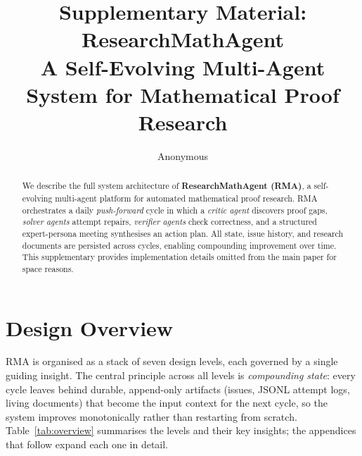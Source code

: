 \documentclass[11pt]{article}
\title{Supplementary Material: ResearchMathAgent\\
A Self-Evolving Multi-Agent System for Mathematical Proof Research}
\author{Anonymous}
\begin{document}
\maketitle

\begin{abstract}
We describe the full system architecture of \textbf{ResearchMathAgent (RMA)}, a
self-evolving multi-agent platform for automated mathematical proof research.
RMA orchestrates a daily \emph{push-forward} cycle in which a \emph{critic agent}
discovers proof gaps, \emph{solver agents} attempt repairs, \emph{verifier agents}
check correctness, and a structured expert-persona meeting synthesises an action plan.
All state, issue history, and research documents are persisted across cycles,
enabling compounding improvement over time.
This supplementary provides implementation details omitted from the main paper for space reasons.
\end{abstract}

\section{Design Overview}
\label{sec:overview}

RMA is organised as a stack of seven design levels, each governed by a single
guiding insight. The central principle across all levels is
\emph{compounding state}: every cycle leaves behind durable, append-only
artifacts (issues, JSONL attempt logs, living documents) that become the input
context for the next cycle, so the system improves monotonically rather than
restarting from scratch. Table~\ref{tab:overview} summarises the levels and
their key insights; the appendices that follow expand each one in detail.
\end{document}
